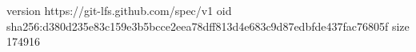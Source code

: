 version https://git-lfs.github.com/spec/v1
oid sha256:d380d235e83c159e3b5bcce2eea78dff813d4e683c9d87edbfde437fac76805f
size 174916
